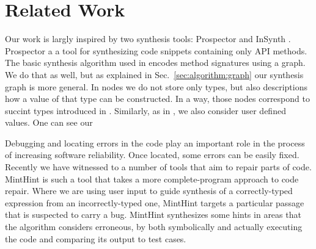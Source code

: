 \section{Related Work}
\label{sec:related}

Our work is largly inspired by two synthesis tools: Prospector \cite{MandelinetALL2005Jungloid} and InSynth \cite{GveroETAL13CompleteCompletionTypesWeights, DBLP:conf/cav/GveroKP11}.
Prospector a a tool for synthesizing code snippets containing only API methods. The basic synthesis algorithm used in \cite{MandelinetALL2005Jungloid} encodes method signatures using a graph. We do that as well, but as explained in Sec.~\ref{sec:algorithm:graph}
our synthesis graph is more general. In nodes we do not store only types, but also descriptions how a value of that type can be constructed. In a way, those nodes correspond to succint types introduced in  \cite{GveroETAL13CompleteCompletionTypesWeights}. Similarly, as in \cite{GveroETAL13CompleteCompletionTypesWeights}, we also consider user defined values. One can see our  




Debugging and locating errors in the code \cite{Pavlinovic:2014,
  Chandra:2011:AD} play an important role in the process of increasing
software reliability. Once located, some errors can be easily
fixed. Recently we have witnessed to a number of tools that aim to
repair parts of code. MintHint \cite{MintHint} is such a tool that
takes a more complete-program approach to code repair. Where we are
using user input to guide synthesis of a correctly-typed expression
from an incorrectly-typed one, MintHint targets a particular passage
that is suspected to carry a bug. MintHint synthesizes some hints in
areas that the algorithm considers erroneous, by both symbolically and
actually executing the code and comparing its output to test cases.



